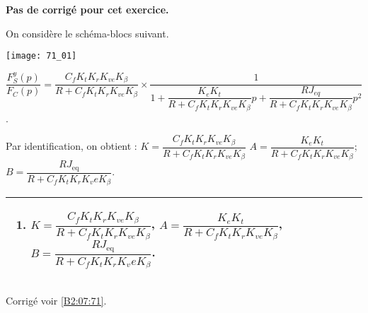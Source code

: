 \normalfalse \difficiletrue \tdifficilefalse
\correctiontrue


\setcounter{question}{0}
\ifcorrection
\else
\textbf{Pas de corrigé pour cet exercice.}
\fi

\ifprof
\else

On considère le schéma-blocs suivant.
\begin{center}
\texttt{[image: 71\_01]}
\end{center}
\fi
{}
\ifprof
\begin{corrige}

$\dfrac{F_S^y (p)}{F_C (p)}=\dfrac{C_f K_t K_r K_{ve} K_{\beta}}{R+C_f K_t K_r K_{ve} K_{\beta} } \times \dfrac{1}{1+\dfrac{K_e K_t}{R+C_f K_t K_r K_{ve} K_{\beta} }p+\dfrac{RJ_{eq}}{R+C_f K_t K_r K_{ve} K_{\beta} } p^2}$.


Par identification, on obtient :
$K=\dfrac{C_f K_t K_r K_{ve} K_{\beta}}{R+C_f K_t K_r K_{ve} K_{\beta}}$
$A=\dfrac{K_e K_t}{R+C_f K_t K_r K_{ve} K_{\beta} }$;
$B=\dfrac{RJ_{\text{eq}}}{R+C_f K_t K_r K_ve K_{\beta} }$.

\end{corrige}
\else
\fi

 
 \ifprof
\else
\ifcolle
\else
\footnotesize
\noindent
\begin{tabular}{|p{.95\linewidth}|}
\hline
\begin{enumerate}
\item $K=\dfrac{C_f K_t K_r K_{ve} K_{\beta}}{R+C_f K_t K_r K_{ve} K_{\beta}}$,
$A=\dfrac{K_e K_t}{R+C_f K_t K_r K_{ve} K_{\beta} }$,
$B=\dfrac{RJ_{\text{eq}}}{R+C_f K_t K_r K_ve K_{\beta} }$.
\end{enumerate} \\ \hline
\end{tabular}
\normalsize
\fi

\fi


\ifprof
\else
\begin{flushright}
\footnotesize{Corrigé  voir \ref{B2:07:71}.}
\end{flushright}%
\fi